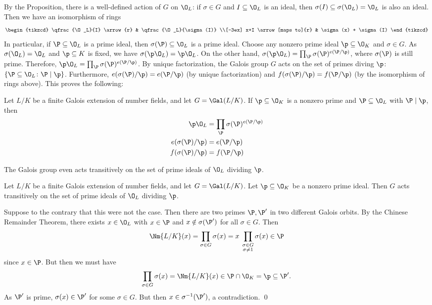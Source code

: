 By the Proposition, there is a well-defined action of $G$ on $\O_L$: if $\sigma \in G$ and $I \subseteq \O_L$ is an ideal, then $\sigma(I) \subseteq \sigma(\O_L)=\O_L$ is also an ideal. Then we have an isomorphism of rings
	\[
	\begin{tikzcd}
	\qfrac{\O_L}{I} \arrow{r} & \qfrac{\O_L}{\sigma(I)} \\[-3ex]
	x+I \arrow[maps to]{r} & \sigma(x) + \sigma(I)
	\end{tikzcd}
	\]
In particular, if $\P \subseteq \O_L$ is a prime ideal, then $\sigma(\P) \subseteq \O_L$ is a prime ideal. Choose any nonzero prime ideal $\p \subseteq \O_K$ and $\sigma \in G$. As $\sigma(\O_L)=\O_L$ and $\p \subseteq K$ is fixed, we have $\sigma(\p \O_L)=\p \O_L$. On the other hand, $\sigma(\p \O_L)=\prod_\P \sigma(\P)^{e(\P/\p)}$, where $\sigma(\P)$ is still prime. Therefore, $\p\O_L= \prod_\P \sigma(\P)^{e(\P/\p)}$. By unique factorization, the Galois group $G$ acts on the set of primes diving $\p$: $\{ \P \subseteq \O_L \colon \P \mid \p\}$. Furthermore, $e(\sigma(\P)/\p)=e(\P/\p)$ (by unique factorization) and $f(\sigma(\P)/\p)=f(\P/\p)$ (by the isomorphism of rings above). This proves the following:


\begin{prop}\label{prop:sigma}
Let $L/K$ be a finite Galois extension of number fields, and let $G=\Gal(L/K)$. If $\p \subseteq \O_K$ is a nonzero prime and $\P \subseteq \O_L$ with $\P \mid \p$, then
	\[
	\begin{split}
	\p\O_L&= \prod_\P \sigma(\P)^{e(\P/\p)} \\
	e(\sigma(\P)/\p)&=e(\P/\p) \\
	f(\sigma(\P)/\p)&=f(\P/\p)
	\end{split}
	\]
\end{prop}

The Galois group even acts transitively on the set of prime ideals of $\O_L$ dividing $\p$.

\begin{prop}\label{prop:transitive}
Let $L/K$ be a finite Galois extension of number fields, and let $G=\Gal(L/K)$. Let $\p \subseteq \O_K$ be a nonzero prime ideal. Then $G$ acts transitively on the set of prime ideals of $\O_L$ dividing $\p$. 
\end{prop}

\pf Suppose to the contrary that this were not the case. Then there are two primes $\P,\P'$ in two different Galois orbits. By the Chinese Remainder Theorem, there exists $x \in \O_L$ with $x \in \P$ and $x \notin \sigma(\P')$ for all $\sigma \in G$. Then
	\[
	\Nm{L/K}(x)= \prod_{\sigma \in G} \sigma(x) = x \; \prod_{\substack{\sigma \in G \\ \sigma \neq 1}} \sigma(x) \in \P
	\]
since $x \in \P$. But then we must have
	\[
	\prod_{\sigma \in G} \sigma(x)= \Nm{L/K}(x) \in \P \cap \O_K=\p \subseteq \P'.
	\]
As $\P'$ is prime, $\sigma(x) \in \P'$ for some $\sigma \in G$. But then $x \in \sigma^{-1}(\P')$, a contradiction. \qed \\


